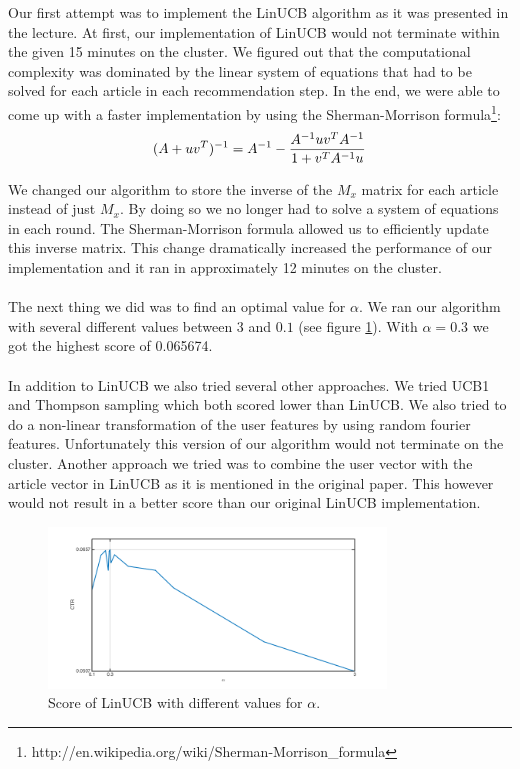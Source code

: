 \documentclass[a4paper,11pt]{article}
\begin{document}
Our first attempt was to implement the LinUCB algorithm as it was presented in the lecture. 
At first, our implementation of LinUCB would not terminate within the given 15 minutes on the cluster. 
We figured out that the computational complexity was dominated by the linear system of equations that had to be solved 
for each article in each recommendation step. In the end, we were able to come up with a faster implementation by using
the Sherman-Morrison formula\footnote{http://en.wikipedia.org/wiki/Sherman-Morrison\_formula}:
$$(A+uv^T)^{-1} = A^{-1} - {A^{-1}uv^T A^{-1} \over 1 + v^T A^{-1}u}$$

We changed our algorithm to store the inverse of the $M_x$ matrix for each article instead of just $M_x$. By doing so we no longer had to 
solve a system of equations in each round. The Sherman-Morrison formula allowed us to efficiently update this inverse matrix. 
This change dramatically increased the performance of our implementation and it ran in approximately 12 minutes on the cluster.
\\\\
The next thing we did was to find an optimal value for $\alpha$. 
We ran our algorithm with several different values between $3$ and $0.1$ (see figure \ref{fig:scores}). 
With $\alpha=0.3$ we got the highest score of 0.065674.
\\\\
In addition to LinUCB we also tried several other approaches. We tried UCB1 and Thompson sampling which both scored lower than LinUCB. 
We also tried to do a non-linear transformation of the user features by using random fourier features. 
Unfortunately this version of our algorithm would not terminate on the cluster.
Another approach we tried was to combine the user vector with the article vector in LinUCB as it is mentioned in the original paper. This however
would not result in a better score than our original LinUCB implementation.

\begin{figure}[t]
\centering
\includegraphics[width=0.8\textwidth]{scores}
\caption{Score of LinUCB with different values for $\alpha$.}
\label{fig:scores}
\end{figure}
\end{document}
